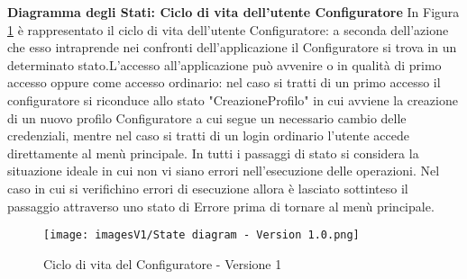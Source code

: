 \newpage
\textbf{Diagramma degli Stati: Ciclo di vita dell'utente Configuratore}\newline
In Figura \ref{fig:State diagram 1.1} è rappresentato il ciclo di vita dell'utente Configuratore: a seconda dell'azione che esso intraprende nei confronti dell'applicazione il Configuratore si trova in un determinato stato.\newline L'accesso all'applicazione può avvenire o in qualità di primo accesso oppure come accesso ordinario: nel caso si tratti di un primo accesso il configuratore si riconduce allo stato "CreazioneProfilo" in cui avviene la creazione di un nuovo profilo Configuratore a cui segue un necessario cambio delle credenziali, mentre nel caso si tratti di un login ordinario l'utente accede direttamente al menù principale. \newline 
In tutti i passaggi di stato si considera la situazione ideale in cui non vi siano errori nell'esecuzione delle operazioni. Nel caso in cui si verifichino errori di esecuzione allora è lasciato sottinteso il passaggio attraverso uno stato di Errore prima di tornare al menù principale.

\begin{figure}[b!]
\centering
\texttt{[image: imagesV1/State diagram - Version 1.0.png]}
\caption{\label{fig:State diagram 1.1}Ciclo di vita del Configuratore - Versione 1}
\end{figure}\bigskip